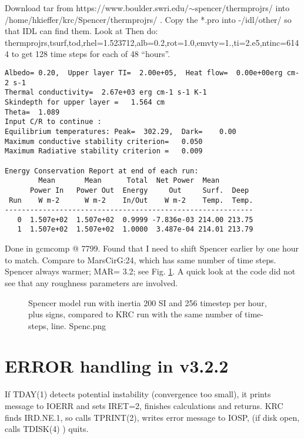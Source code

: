 \documentclass{article}
\begin{document}
 Download tar from https://www.boulder.swri.edu/$\sim$spencer/thermprojrs/ into
/home/hkieffer/krc/Spencer/thermprojrs/ . Copy the *.pro into -/idl/other/ so that IDL can find them. Look at  Then do:
\\ thermprojrs,tsurf,tod,rhel=1.523712,alb=0.2,rot=1.0,emvty=1.,ti=2.e5,ntinc=6144
\qi to get 128 time steps for each of 48 ``hours''.
\vspace{-3.mm} 
\begin{verbatim} 
Albedo= 0.20,  Upper layer TI=  2.00e+05,  Heat flow=  0.00e+00erg cm-2 s-1
Thermal conductivity=  2.67e+03 erg cm-1 s-1 K-1
Skindepth for upper layer =   1.564 cm
Theta=  1.089
Input C/R to continue : 
Equilibrium temperatures: Peak=  302.29,  Dark=    0.00
Maximum conductive stability criterion=   0.050
Maximum Radiative stability criterion =   0.009

Energy Conservation Report at end of each run:
        Mean       Mean      Total  Net Power  Mean
      Power In   Power Out  Energy     Out     Surf.  Deep
 Run    W m-2      W m-2    In/Out    W m-2    Temp.  Temp.
-----------------------------------------------------------
   0  1.507e+02  1.507e+02  0.9999 -7.836e-03 214.00 213.75
   1  1.507e+02  1.507e+02  1.0000  3.487e-04 214.01 213.79
\end{verbatim} 
 
Done in gcmcomp @ 7799. Found that I need to shift Spencer earlier by one hour to match. Compare to MarsCirG:24, which has same number of time steps. Spencer always warmer; MAR= 3.2; see Fig. \ref{Spenc}.  A quick look at the code did not see that any roughness parameters are involved.

\begin{figure}[!ht] 
\caption[Spencer model]{Spencer model run with inertia 200 SI and 256 timestep per hour, plus signs, compared to KRC run with the same number of time-steps, line.
\label{Spenc} Spenc.png }
\end{figure} 


\appendix %
\section{ERROR handling in v3.2.2}

If TDAY(1) detects potential instability (convergence too small), it prints message to IOERR and sets IRET=2, finishes calculations and returns.
\qi KRC finds IRD.NE.1, so calls TPRINT(2), writes error message to IOSP,
\qii (if disk open, calls TDISK(4) ) 
\qi quits.
\end{document}
